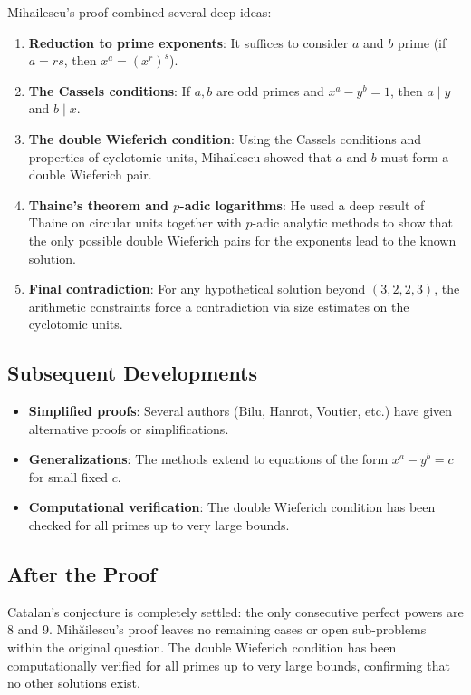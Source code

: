 Mihailescu's proof combined several deep ideas:

\begin{enumerate}
\item \textbf{Reduction to prime exponents}: It suffices to consider $a$ and $b$ prime (if $a = rs$, then $x^a = (x^r)^s$).
\item \textbf{The Cassels conditions}: If $a, b$ are odd primes and $x^a - y^b = 1$, then $a \mid y$ and $b \mid x$.
\item \textbf{The double Wieferich condition}: Using the Cassels conditions and properties of cyclotomic units, Mihailescu showed that $a$ and $b$ must form a double Wieferich pair.
\item \textbf{Thaine's theorem and $p$-adic logarithms}: He used a deep result of Thaine on circular units together with $p$-adic analytic methods to show that the only possible double Wieferich pairs for the exponents lead to the known solution.
\item \textbf{Final contradiction}: For any hypothetical solution beyond $(3, 2, 2, 3)$, the arithmetic constraints force a contradiction via size estimates on the cyclotomic units.
\end{enumerate}

\subsection{Subsequent Developments}

\begin{itemize}
\item \textbf{Simplified proofs}: Several authors (Bilu, Hanrot, Voutier, etc.) have given alternative proofs or simplifications.
\item \textbf{Generalizations}: The methods extend to equations of the form $x^a - y^b = c$ for small fixed $c$.
\item \textbf{Computational verification}: The double Wieferich condition has been checked for all primes up to very large bounds.
\end{itemize}

\subsection{After the Proof}

Catalan's conjecture is completely settled: the only consecutive perfect powers are 8 and 9. Mihăilescu's proof leaves no remaining cases or open sub-problems within the original question. The double Wieferich condition has been computationally verified for all primes up to very large bounds, confirming that no other solutions exist.

